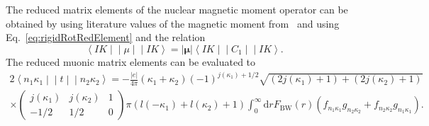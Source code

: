The reduced matrix elements of the nuclear magnetic moment operator can be obtained by using literature values of the magnetic moment  from~\cite{Stone2005} and using Eq.~\eqref{eq:rigidRotRedElement} and the relation
\begin{equation}
\left< IK\middle|\middle|\mu \middle|\middle|IK\right> =
|\mathbf{\mu}| \left< IK\middle|\middle|C_1 \middle|\middle|IK\right>.
\end{equation}
The reduced muonic matrix elements can be evaluated to~\cite{johnson2007}
\begin{alignat}{2}
\left< n_1\kappa_1\middle|\middle|t \middle|\middle| n_2\kappa_2\right> = -\frac{|e|}{4\pi}(\kappa_1+\kappa_2)(-1)^{j(\kappa_1)+1/2}\sqrt{(2j(\kappa_1)+1)+(2j(\kappa_2)+1)}\qquad\quad\;\\[7.5pt]
\times
\begin{pmatrix}
j(\kappa_1)&j(\kappa_2)&1\\
-1/2&1/2&0
\end{pmatrix}
\pi(l(-\kappa_1)+l(\kappa_2)+1)\int_0^\infty \text{d}r F_{\text{BW}}(r)\left(f_{n_1\kappa_1}g_{n_2\kappa_2}+f_{n_2\kappa_2}g_{n_1\kappa_1} \right).
\end{alignat}

